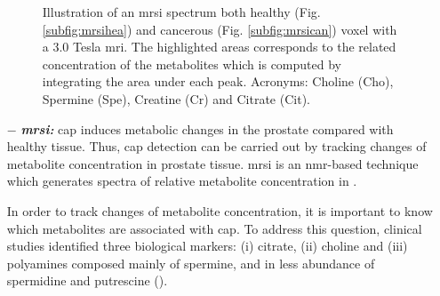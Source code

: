 \begin{enumerate}[leftmargin=*]
\begin{figure}
	\centering
	\hspace*{\fill}
	 \hfill
	\hspace*{\fill}
	\caption{Illustration of an \ac{mrsi} spectrum both healthy (Fig. \ref{subfig:mrsihea}) and cancerous (Fig. \ref{subfig:mrsican}) voxel with a 3.0 Tesla \ac{mri}. The highlighted areas corresponds to the related concentration of the metabolites which is computed by integrating the area under each peak. Acronyms: Choline (Cho), Spermine (Spe), Creatine (Cr) and Citrate (Cit).}
	\label{fig:mrsi}
\end{figure}

\item[$-$] \textbf{\textit{\ac{mrsi}:}} \ac{cap} induces metabolic changes in the prostate compared with healthy tissue. Thus, \ac{cap} detection can be carried out by tracking changes of metabolite concentration in prostate tissue. \ac{mrsi} is an \ac{nmr}-based technique which generates spectra of relative metabolite concentration in .

In order to track changes of metabolite concentration, it is important to know which metabolites are associated with \ac{cap}. To address this question, clinical studies identified three biological markers: (i) citrate, (ii) choline and (iii) polyamines composed mainly of spermine, and in less abundance of spermidine and putrescine (\cite{Awwad2012,Costello2006,Giskeodegard2013}). 


\end{enumerate}
